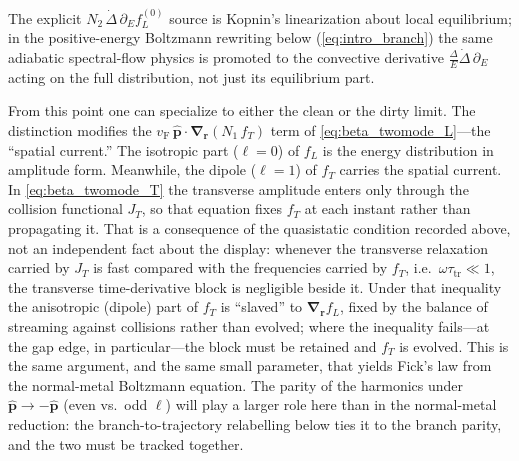 \documentclass[
  aps,
  prb,
  preprint,
  superscriptaddress,
  longbibliography,
  nofootinbib
]{revtex4-2}
\newcommand{\br}{\mathbf{r}}
\newcommand{\bp}{\mathbf{p}}
\newcommand{\bnabla}{\boldsymbol{\nabla}}
\newcommand{\vF}{v_{\mathrm{F}}}
\newcommand{\tautr}{\tau_{\mathrm{tr}}}
\newcommand{\DOS}{N_1}
\newcommand{\fL}{f_L}
\newcommand{\fT}{f_T}
\begin{document}
The explicit \(N_2\,\dot\Delta\,\partial_E\fL^{(0)}\) source is Kopnin's
linearization about local equilibrium; in the positive-energy Boltzmann
rewriting below (\cref{eq:intro_branch}) the same adiabatic
spectral-flow physics is promoted to the convective derivative
\(\tfrac{\Delta}{E}\dot\Delta\,\partial_E\) acting on the full
distribution, not just its equilibrium part.

From this point one can specialize to either the clean or the dirty
limit. The distinction modifies the \(\vF\,\hat{\bp}\cdot\bnabla_{\br}(\DOS\,\fT)\) term of
\cref{eq:beta_twomode_L}---the ``spatial current.'' The isotropic
part (\(\ell=0\)) of \(\fL\) is the energy distribution in amplitude
form. Meanwhile, the dipole (\(\ell=1\)) of \(\fT\)
carries the spatial current. In \cref{eq:beta_twomode_T} the transverse amplitude enters only through
the collision functional \(J_T\), so that equation fixes \(\fT\) at each
instant rather than propagating it. That is a consequence of the
quasistatic condition recorded above, not an independent fact about the
display: whenever the transverse relaxation carried by \(J_T\) is fast
compared with the frequencies carried by \(\fT\), i.e.\ \(\omega\tautr\ll1\),
the transverse time-derivative block is negligible beside it. Under that
inequality the anisotropic (dipole) part of \(\fT\) is ``slaved'' to
\(\bnabla_{\br}\fL\), fixed by the balance of streaming against collisions
rather than evolved; where the inequality fails---at the gap edge, in
particular---the block must be retained and \(\fT\) is evolved. This is the
same argument, and the same small parameter, that yields Fick's law from
the normal-metal Boltzmann equation. 
The parity of the harmonics under \(\hat{\bp}\to-\hat{\bp}\) (even
vs.\ odd \(\ell\)) will play a larger role here than in the
normal-metal reduction: the branch-to-trajectory relabelling below
ties it to the branch parity, and the two must be tracked together.
\end{document}
